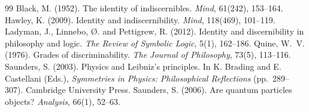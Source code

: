 \documentclass{situationist-preprint}
\begin{document}
\begin{thebibliography}{99}\small
{} Black, M. (1952). The identity of indiscernibles. \emph{Mind}, 61(242), 153--164.
 Hawley, K. (2009). Identity and indiscernibility. \emph{Mind}, 118(469), 101--119.
 Ladyman, J., Linnebo, {\O}. and Pettigrew, R. (2012). Identity and discernibility in philosophy and logic. \emph{The Review of Symbolic Logic}, 5(1), 162--186.
 Quine, W.~V. (1976). Grades of discriminability. \emph{The Journal of Philosophy}, 73(5), 113--116.
 Saunders, S. (2003). Physics and Leibniz's principles. In K. Brading and E. Castellani (Eds.), \emph{Symmetries in Physics: Philosophical Reflections} (pp.~289--307). Cambridge University Press.
 Saunders, S. (2006). Are quantum particles objects? \emph{Analysis}, 66(1), 52--63.
\end{thebibliography}
\end{document}

